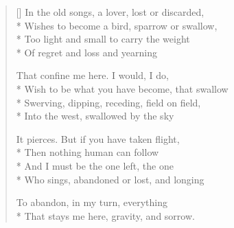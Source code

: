 \label{ch:burden}
\settowidth{\versewidth}{Wish to be what you have become, that swallow}
\begin{verse}[\versewidth]
In the old songs, a lover, lost or discarded,\\*
Wishes to become a bird, sparrow or swallow,\\*
Too light and small to carry the weight\\*
Of regret and loss and yearning

That confine me here.  I would, I do,\\*
Wish to be what you have become, that swallow\\*
Swerving, dipping, receding, field on field,\\*
Into the west, swallowed by the sky

It pierces.    But if you have taken flight,\\*
Then nothing human can follow\\*
And I must be the one left, the one\\*
Who sings, abandoned or lost, and longing

To abandon, in my turn, everything\\*
That stays me here, gravity, and sorrow.
\end{verse}
